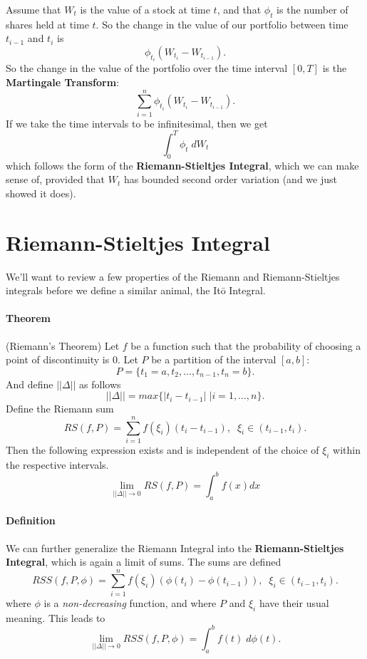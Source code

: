 \documentclass[a4paper,12pt]{scrartcl}
\begin{document}
Assume that $W_t$ is the value of a stock at time $t$, and that $\phi_t$
is the number of shares held at time $t$.  So the change in the value
of our portfolio between time $t_{i-1}$ and $t_i$ is
   \[ \phi_{t_i} \left( W_{t_i} - W_{t_{i-1}} \right). \]
So the change in the value of the portfolio over the time interval
$[0,T]$ is the \textbf{Martingale Transform}:
   \[ \sum^n_{i=1}  \phi_{t_i} \left( W_{t_i} - W_{t_{i-1}} \right). \]
If we take the time intervals to be infinitesimal, then we get
   \[ \int_0^T \phi_t \; dW_t \]
which follows the form of the \textbf{Riemann-Stieltjes Integral}, which
we can make sense of, provided that $W_t$ has bounded second order 
variation (and we just showed it does).


\section{Riemann-Stieltjes Integral}

We'll want to review a few properties of the Riemann and
Riemann-Stieltjes integrals before we define a similar animal, the 
It\={o} Integral.

\paragraph{Theorem} (Riemann's Theorem) Let $f$ be a function such that
the probability of choosing a point of discontinuity is 0.  Let $P$
be a partition of the interval $[a,b]$:
   \[ P = \{ t_1 = a, t_2, \ldots, t_{n-1}, t_n = b \}. \]
And define $||\Delta||$ as follows
   \[ ||\Delta|| = max\{ |t_i - t_{i-1}| \; | i = 1, \ldots, n \}.\]
Define the Riemann sum
   \[ RS(f, P) = \sum^n_{i=1} f(\xi_i) (t_i - t_{i-1}), \;\; \xi_i \in
      (t_{i-1}, t_i).\]
Then the following expression exists and is independent of the choice
of $\xi_i$ within the respective intervals.
   \[ \lim_{||\Delta||\rightarrow 0} RS(f,P) = \int^b_a f(x) dx \]

\paragraph{Definition} We can further generalize the Riemann Integral
into the \textbf{Riemann-Stieltjes Integral}, which is again a limit
of sums.  The sums are defined
   \[ RSS(f,P,\phi) = \sum^n_{i=1} f(\xi_i) (\phi(t_i) - \phi(t_{i-1}))
      , \;\; \xi_i \in (t_{i-1}, t_i).\]
where $\phi$ is a \emph{non-decreasing} function, and where $P$ and 
$\xi_i$ have their usual meaning. This leads to
   \[ \lim_{||\Delta||\rightarrow 0} RSS(f,P,\phi) = 
      \int^b_a f(t)\; d\phi(t).\]
\end{document}
